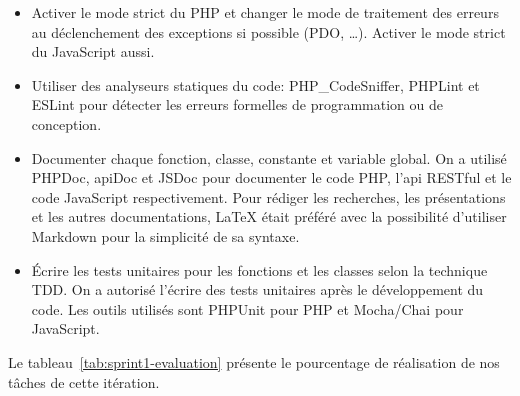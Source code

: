 \begin{itemize}
    \item Activer le mode strict du PHP et changer le mode de traitement des
        erreurs au déclenchement des exceptions si possible (PDO, \ldots).
        Activer le mode strict du JavaScript aussi.
    \item Utiliser des analyseurs statiques du code: PHP\_CodeSniffer, PHPLint
        et ESLint pour détecter les erreurs formelles de programmation ou de
        conception.
    \item Documenter chaque fonction, classe, constante et variable global. On
        a utilisé PHPDoc, apiDoc et JSDoc pour documenter le code PHP, l'api
        RESTful et le code JavaScript respectivement. Pour rédiger les
        recherches, les présentations et les autres documentations, \LaTeX{}
        était préféré avec la possibilité d'utiliser Markdown pour la
        simplicité de sa syntaxe.
    \item Écrire les tests unitaires pour les fonctions et les classes selon la
        technique \acrshort{TDD}. On a autorisé l'écrire des tests unitaires
        après le développement du code. Les outils utilisés sont PHPUnit pour
        PHP et Mocha/Chai pour JavaScript.
\end{itemize}

Le tableau~\ref{tab:sprint1-evaluation} présente le pourcentage de réalisation
de nos tâches de cette itération.

